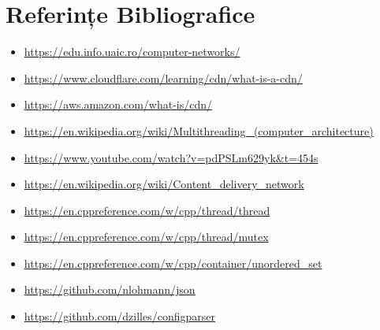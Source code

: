 \documentclass[runningheads]{llncs}
\begin{document}
\section{Referințe Bibliografice}
\begin{itemize}
    \item \url{https://edu.info.uaic.ro/computer-networks/}
     \item \url{https://www.cloudflare.com/learning/cdn/what-is-a-cdn/}
     \item \url{https://aws.amazon.com/what-is/cdn/}
     \item \url{https://en.wikipedia.org/wiki/Multithreading_(computer_architecture)}
     \item \url{https://www.youtube.com/watch?v=pdPSLm629yk&t=454s}
    \item \url{https://en.wikipedia.org/wiki/Content_delivery_network}
    \item \url{https://en.cppreference.com/w/cpp/thread/thread}
    \item \url{https://en.cppreference.com/w/cpp/thread/mutex}
    \item \url{https://en.cppreference.com/w/cpp/container/unordered_set}
    \item \url{https://github.com/nlohmann/json}
    \item \url{https://github.com/dzilles/configparser}
\end{itemize}
\end{document}
